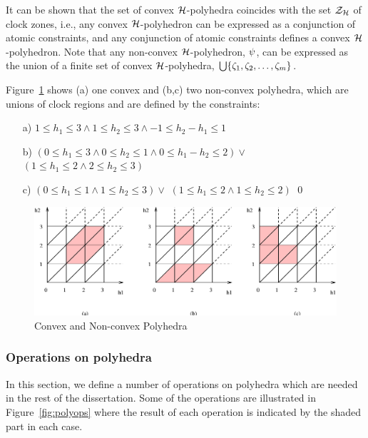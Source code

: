{It can be shown that the set of convex $\clocks$-polyhedra coincides
with the set $\ClockZones$ of clock zones, i.e., any convex
$\clocks$-polyhedron can be expressed as a conjunction of atomic
constraints, and any conjunction of atomic constraints defines a
convex $\clocks$-polyhedron. Note that any non-convex
$\clocks$-polyhedron, ${\psi}$, can be expressed as the union of a
finite set of convex $\clocks$-polyhedra,
$\bigcup\{{\zeta}_1,{\zeta}_2,\ldots,{\zeta}_m\}$.
\begin{exampleb}
Figure~\ref{fig:polyexs} shows (a) one convex and (b,c) two non-convex
polyhedra, which are unions of clock regions and are defined by the
constraints:
\begin{enumerate}
\item[a)] $1 \leq h_1 \leq 3 \land 1 \leq h_2 \leq 3 \land -1 \leq h_2 - h_1\leq 1$
\item[b)] $(0 \leq h_1 \leq 3 \land 0 \leq h_2 \leq 1 \land 0 \leq h_1 - h_2 \leq 2) \lor$ \\ $(1 \leq h_1 \leq 2 \land 2 \leq h_2 \leq 3)$
\item[c)] $(0 \leq h_1 \leq 1 \land 1 \leq h_2 \leq 3) \lor$ $(1 \leq h_1 \leq 2 \land 1 \leq h_2 \leq 2)$
\qed
\end{enumerate}
\end{exampleb}
\begin{figure}
\begin{center}
\includegraphics[width=\linewidth]{METHODS/polyexs.eps}
\end{center}
\caption{Convex and Non-convex Polyhedra\label{fig:polyexs}}
\end{figure}

\subsubsection{Operations on polyhedra} \label{ss:polyops}
In this section, we define a number of operations on polyhedra which
are needed in the rest of the dissertation. Some of the operations are
illustrated in Figure~\ref{fig:polyops} where the result of
each operation is indicated by the shaded part in each case. 

}

